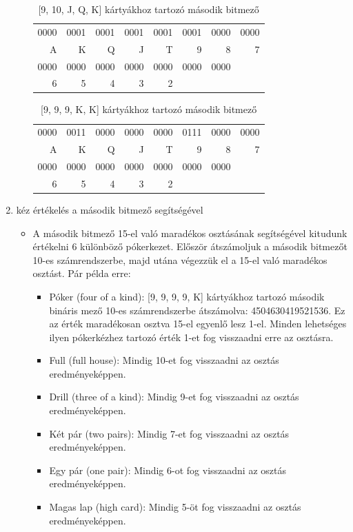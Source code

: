 \documentclass[]{thesis-ekf}
\theoremstyle{definition}
\theoremstyle{remark}
\begin{document}
\begin{enumerate}
\begin{itemize}
		\begin{table}[ht!]
			\centering
			\footnotesize
			\begin{tabular}{*{8}{r}}
				0000 & 0001 & 0001 & 0001 & 0001 & 0001 & 0000 & 0000 \\
				A & K & Q & J & T & 9 & 8 & 7 \\
				0000 & 0000 & 0000 & 0000 & 0000 & 0000 & 0000 \\
				6 & 5 & 4 & 3 & 2 &   &   &   
			\end{tabular}
			\caption{[9, 10, J, Q, K] kártyákhoz tartozó második bitmező}
			\label{tab-bitfieldcounts1}
		\end{table}
		
		\begin{table}[ht!]
			\centering
			\footnotesize
			\begin{tabular}{*{8}{r}}
				0000 & 0011 & 0000 & 0000 & 0000 & 0111 & 0000 & 0000 \\
				A & K & Q & J & T & 9 & 8 & 7 \\
				0000 & 0000 & 0000 & 0000 & 0000 & 0000 & 0000 \\
				6 & 5 & 4 & 3 & 2 &   &   &   
			\end{tabular}
			\caption{[9, 9, 9, K, K] kártyákhoz tartozó második bitmező}
			\label{tab-bitfieldcounts2}
		\end{table}
		
	\end{itemize}
	\item kéz értékelés a második bitmező segítségével
	\begin{itemize}
		\item A második bitmező 15-el való maradékos osztásának segítségével kitudunk értékelni 6 különböző pókerkezet. Először átszámoljuk a második bitmezőt 10-es számrendszerbe, majd utána végezzük el a 15-el való maradékos osztást. Pár példa erre:
		\begin{itemize}
			\item Póker (four of a kind): [9, 9, 9, 9, K]
			kártyákhoz tartozó második bináris mező 10-es számrendszerbe átszámolva: 4504630419521536. Ez az érték maradékosan osztva 15-el egyenlő lesz 1-el. Minden lehetséges ilyen pókerkézhez tartozó érték 1-et fog visszaadni erre az osztásra.
			\item Full (full  house): Mindig 10-et fog visszaadni az osztás eredményeképpen.
			\item Drill (three of a kind): Mindig 9-et fog visszaadni az osztás eredményeképpen.
			\item Két pár (two pairs): Mindig 7-et fog visszaadni az osztás eredményeképpen.
			\item Egy pár (one pair): Mindig 6-ot fog visszaadni az osztás eredményeképpen.
			\item Magas lap (high card): Mindig 5-öt fog visszaadni az osztás eredményeképpen.
		\end{itemize}
		

\end{itemize}
\end{enumerate}
\end{document}
